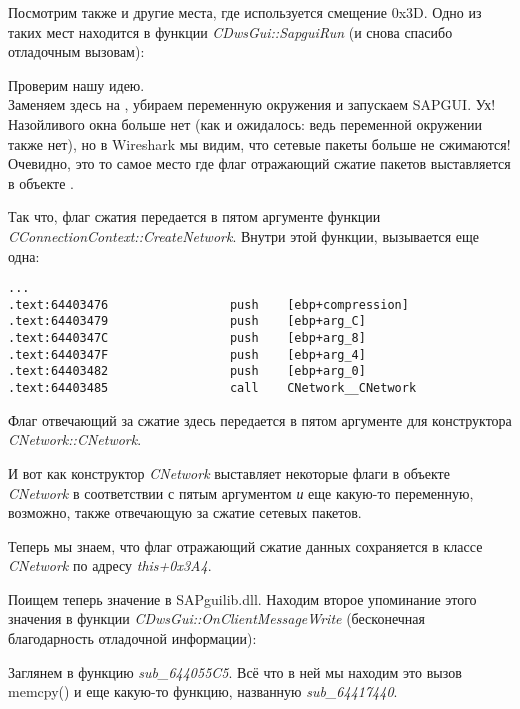 Посмотрим также и другие места, где используется смещение 0x3D.
Одно из таких мест находится в функции \emph{CDwsGui::SapguiRun} (и снова спасибо отладочным вызовам):



Проверим нашу идею.\\
Заменяем  здесь на , убираем переменную окружения 
\TDWNC и запускаем SAPGUI. Ух! Назойливого окна больше нет (как и ожидалось: ведь переменной окружении также
нет), но в Wireshark мы видим, что сетевые пакеты больше не сжимаются!
Очевидно, это то самое место где флаг отражающий сжатие пакетов выставляется в объекте .

Так что, флаг сжатия передается в пятом аргументе функции \\
\emph{CConnectionContext::CreateNetwork}. Внутри этой функции, вызывается еще одна:

\begin{lstlisting}[style=customasmx86]
...
.text:64403476                 push    [ebp+compression]
.text:64403479                 push    [ebp+arg_C]
.text:6440347C                 push    [ebp+arg_8]
.text:6440347F                 push    [ebp+arg_4]
.text:64403482                 push    [ebp+arg_0]
.text:64403485                 call    CNetwork__CNetwork
\end{lstlisting}

Флаг отвечающий за сжатие здесь передается в пятом аргументе для конструктора \emph{CNetwork::CNetwork}.

И вот как конструктор \emph{CNetwork} выставляет некоторые флаги в объекте \emph{CNetwork} в соответствии с пятым аргументом \emph{и}
еще какую-то переменную, возможно, также отвечающую за сжатие сетевых пакетов.



Теперь мы знаем, что флаг отражающий сжатие данных сохраняется в классе \emph{CNetwork} по адресу \emph{this+0x3A4}.

Поищем теперь значение  в SAPguilib.dll. Находим второе упоминание этого значения в функции
\emph{CDwsGui::OnClientMessageWrite} (бесконечная благодарность отладочной информации):



Заглянем в функцию \emph{sub\_644055C5}. Всё что в ней мы находим это вызов memcpy() и еще какую-то функцию, названную
\IDA \emph{sub\_64417440}.

